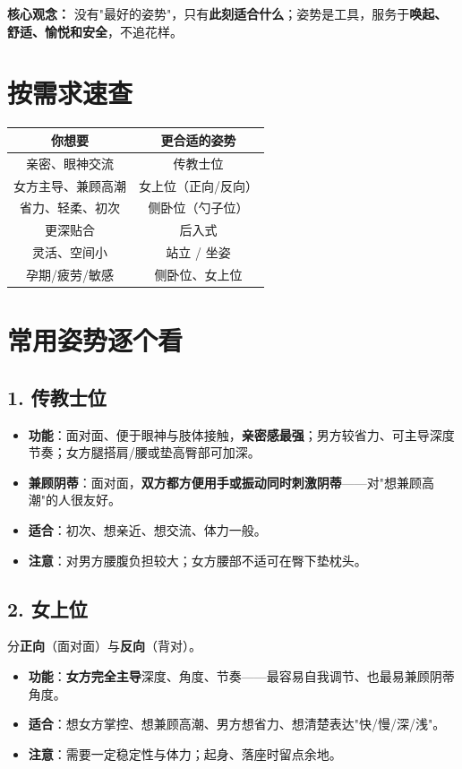 \documentclass[12pt,UTF8,openany]{ctexbook}
\begin{document}
\noindent\textbf{核心观念：} 没有"最好的姿势"，只有\textbf{此刻适合什么}；姿势是工具，服务于\textbf{唤起、舒适、愉悦和安全}，不追花样。

\section{按需求速查}

\begin{tabularx}{\textwidth}{C C}
\toprule
你想要 & 更合适的姿势 \\
\midrule
亲密、眼神交流 & 传教士位 \\
女方主导、兼顾高潮 & 女上位（正向/反向） \\
省力、轻柔、初次 & 侧卧位（勺子位） \\
更深贴合 & 后入式 \\
灵活、空间小 & 站立 / 坐姿 \\
孕期/疲劳/敏感 & 侧卧位、女上位 \\
\bottomrule
\end{tabularx}

\section{常用姿势逐个看}

\subsection*{1. 传教士位}
\begin{itemize}[leftmargin=2em,itemsep=0.3em]
  \item \textbf{功能}：面对面、便于眼神与肢体接触，\textbf{亲密感最强}；男方较省力、可主导深度节奏；女方腿搭肩/腰或垫高臀部可加深。
  \item \textbf{兼顾阴蒂}：面对面，\textbf{双方都方便用手或振动同时刺激阴蒂}——对"想兼顾高潮"的人很友好。
  \item \textbf{适合}：初次、想亲近、想交流、体力一般。
  \item \textbf{注意}：对男方腰腹负担较大；女方腰部不适可在臀下垫枕头。
\end{itemize}

\subsection*{2. 女上位}

分\textbf{正向}（面对面）与\textbf{反向}（背对）。
\begin{itemize}[leftmargin=2em,itemsep=0.3em]
  \item \textbf{功能}：\textbf{女方完全主导}深度、角度、节奏——最容易自我调节、也最易兼顾阴蒂角度。
  \item \textbf{适合}：想女方掌控、想兼顾高潮、男方想省力、想清楚表达"快/慢/深/浅"。
  \item \textbf{注意}：需要一定稳定性与体力；起身、落座时留点余地。
\end{itemize}
\end{document}
